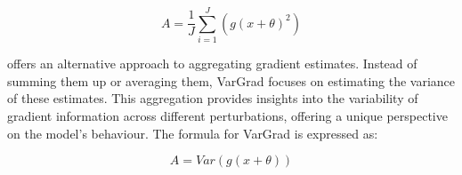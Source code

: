 $$ A = \frac{1}{J}\sum_{i=1}^{J} (g(x+\theta)^2)$$

 \cite{adebayo2020sanity} offers an alternative approach to aggregating gradient estimates. Instead of summing them up or averaging them, VarGrad focuses on estimating the variance of these estimates. This aggregation provides insights into the variability of gradient information across different perturbations, offering a unique perspective on the model's behaviour. The formula for VarGrad is expressed as:

$$ A = Var(g(x+\theta))$$


%
%
%
%



